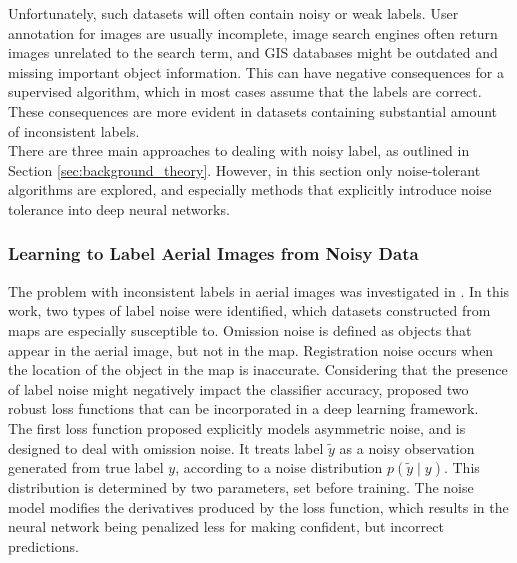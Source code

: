 Unfortunately, such datasets will often contain noisy or weak labels. User annotation for images are usually incomplete, image search engines often return images unrelated to the search term, and \ac{GIS} databases might be outdated and missing important object information. This can have negative consequences for a supervised algorithm, which in most cases assume that the labels are correct. These consequences are more evident in datasets containing substantial amount of inconsistent labels.\\
 
There are three main approaches to dealing with noisy label, as outlined in Section \ref{sec:background_theory}. However, in this section only noise-tolerant algorithms are explored, and especially methods that explicitly introduce noise tolerance into deep neural networks.  


\subsubsection{Learning to Label Aerial Images from Noisy Data}
The problem with inconsistent labels in aerial images was investigated in \citep{Mnih_aerial_images_noisy}. In this work, two types of label noise were identified,  which datasets constructed from maps are especially susceptible to. Omission noise is defined as objects that appear in the aerial image, but not in the map. Registration noise occurs when the location of the object in the map is inaccurate. Considering that the presence of label noise might negatively impact the classifier accuracy, \cite{Mnih_aerial_images_noisy} proposed two robust loss functions that can be incorporated in a deep learning framework. \\

The first loss function proposed explicitly models asymmetric noise, and is designed to deal with omission noise. It treats label $\tilde{y}$ as a noisy observation generated from true label $y$, according to a noise distribution $p(\tilde{y} \mid y)$. This distribution is determined by two parameters, set before training. The noise model modifies the derivatives produced by the loss function, which results in the neural network being penalized less for making confident, but incorrect predictions. \\

